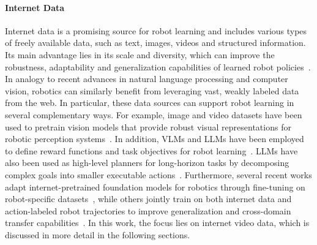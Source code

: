 \paragraph{Internet Data}
	Internet data is a promising source for robot learning and includes various types of freely available data, such as text, images, videos and structured information. Its main advantage lies in its scale and diversity, which can improve the robustness, adaptability and generalization capabilities of learned robot policies~\cite{McCarthy_2025,Eze2024LearningBW}. In analogy to recent advances in natural language processing and computer vision, robotics can similarly benefit from leveraging vast, weakly labeled data from the web. 
	In particular, these data sources can support robot learning in several complementary ways. For example, image and video datasets have been used to pretrain vision models that provide robust visual representations for robotic perception systems~\cite{Nair2022R3MAU, Wang2022VRL3AD}. In addition, \acp{VLM} and \acp{LLM} have been employed to define reward functions and task objectives for robot learning~\cite{Tam2022SemanticEF, Du2023VisionLanguageMA, Yu2023LanguageTR, Klissarov2023MotifIM}. \acp{LLM} have also been used as high-level planners for long-horizon tasks by decomposing complex goals into smaller executable actions~\cite{Ahn2022DoAI, Huang2022InnerME}. Furthermore, several recent works adapt internet-pretrained foundation models for robotics through fine-tuning on robot-specific datasets~\cite{Brohan2023RT2VM, Kim2024OpenVLAAO}, while others jointly train on both internet data and action-labeled robot trajectories to improve generalization and cross-domain transfer capabilities~\cite{Reed2022AGA}.
	In this work, the focus lies on internet video data, which is discussed in more detail in the following sections.



